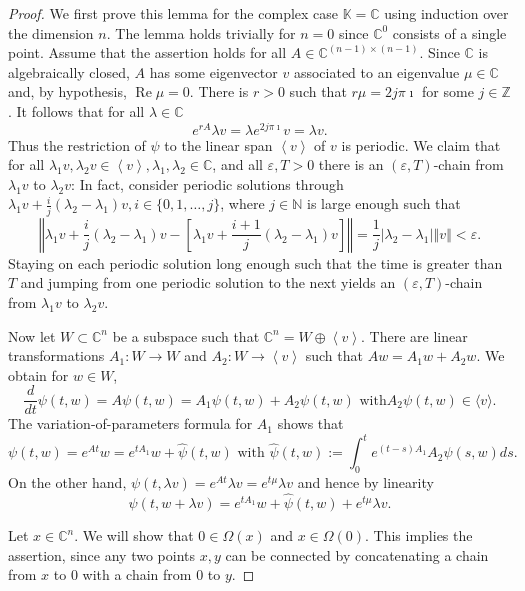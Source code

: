 \documentclass{siamltex}%
\begin{document}
\begin{proof}
We first prove this lemma for the complex case $\mathbb{K}=\mathbb{C}$ using
induction over the dimension $n$. The lemma holds trivially for $n=0$ since
$\mathbb{C}^{0}$ consists of a single point. Assume that the assertion holds
for all $A\in\mathbb{C}^{(n-1)\times(n-1)}$. Since $\mathbb{C}$ is
algebraically closed, $A$ has some eigenvector $v$ associated to an eigenvalue
$\mu\in\mathbb{C}$ and, by hypothesis, $\operatorname{Re}\mu=0$. There is
$r>0$ such that $r\mu=2j\pi\imath$ for some $j\in\mathbb{Z}$. It follows that
for all $\lambda\in\mathbb{C}$%
\[
e^{rA}\lambda v=\lambda e^{2j\pi\imath}v=\lambda v.
\]
Thus the restriction of $\psi$ to the linear span $\left\langle v\right\rangle
$ of $v$ is periodic. We claim that for all $\lambda_{1}v,\lambda_{2}%
v\in\left\langle v\right\rangle ,\lambda_{1},\lambda_{2}\in\mathbb{C}$, and
all $\varepsilon,T>0$ there is an $(\varepsilon,T)$-chain from $\lambda_{1}v$
to $\lambda_{2}v$: In fact, consider periodic solutions through $\lambda
_{1}v+\frac{i}{j}(\lambda_{2}-\lambda_{1})v,i\in\{0,1,\ldots,j\}$, where
$j\in\mathbb{N}$ is large enough such that%
\[
\left\Vert \lambda_{1}v+\frac{i}{j}(\lambda_{2}-\lambda_{1})v-\left[
\lambda_{1}v+\frac{i+1}{j}(\lambda_{2}-\lambda_{1})v\right]  \right\Vert
=\frac{1}{j}\left\vert \lambda_{2}-\lambda_{1}\right\vert \left\Vert
v\right\Vert <\varepsilon.
\]
Staying on each periodic solution long enough such that the time is greater
than $T$ and jumping from one periodic solution to the next yields an
$(\varepsilon,T)$-chain from $\lambda_{1}v$ to $\lambda_{2}v$.

Now let $W\subset\mathbb{C}^{n}$ be a subspace such that $\mathbb{C}%
^{n}=W\oplus\left\langle v\right\rangle $. There are linear transformations
$A_{1}:W\rightarrow W$ and $A_{2}:W\rightarrow\left\langle v\right\rangle $
such that $Aw=A_{1}w+A_{2}w$. We obtain for $w\in W$,%
\[
\frac{d}{dt}\psi(t,w)=A\psi(t,w)=A_{1}\psi(t,w)+A_{2}\psi(t,w)\text{ with
}A_{2}\psi(t,w)\in\langle v\rangle.
\]
The variation-of-parameters formula for $A_{1}$ shows that%
\[
\psi(t,w)=e^{At}w=e^{tA_{1}}w+\widehat{\psi}(t,w)\text{ with }\widehat{\psi
}(t,w):=\int_{0}^{t}e^{(t-s)A_{1}}A_{2}\psi(s,w)ds.
\]
On the other hand, $\psi(t,\lambda v)=e^{At}\lambda v=e^{t\mu}\lambda v$ and
hence by linearity%
\begin{equation}
\psi(t,w+\lambda v)=e^{tA_{1}}w+\widehat{\psi}(t,w)+e^{t\mu}\lambda v.
\label{e_1}%
\end{equation}


Let $x\in\mathbb{C}^{n}$. We will show that $0\in\Omega(x)$ and $x\in
\Omega(0)$. This implies the assertion, since any two points $x,y$ can be
connected by concatenating a chain from $x$ to $0$ with a chain from $0$ to
$y$.


\end{proof}
\end{document}
